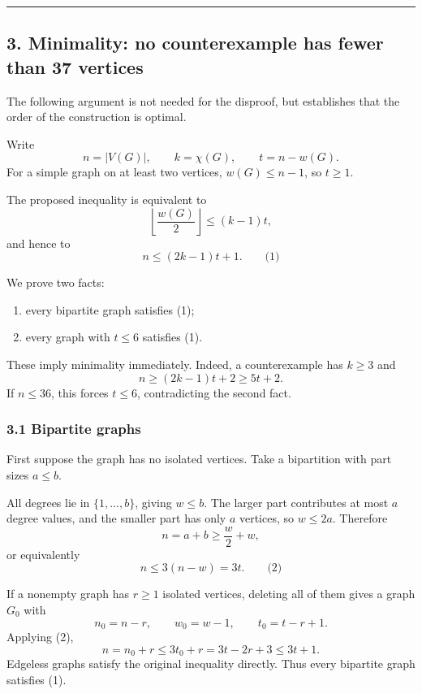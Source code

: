 \documentclass[
  11pt,
  a4paper,
]{article}
\newcounter{none} %
\providecommand{\tightlist}{%
  \setlength{\itemsep}{0pt}\setlength{\parskip}{0pt}}
\begin{document}
\begin{center}\rule{0.5\linewidth}{0.5pt}\end{center}

\subsection{3. Minimality: no counterexample has fewer than 37
vertices}\label{minimality-no-counterexample-has-fewer-than-37-vertices}

The following argument is not needed for the disproof, but establishes
that the order of the construction is optimal.

Write \[
n=|V(G)|,\qquad k=\chi(G),\qquad t=n-w(G).
\] For a simple graph on at least two vertices, \(w(G)\le n-1\), so
\(t\ge1\).

The proposed inequality is equivalent to \[
\left\lfloor\frac{w(G)}2\right\rfloor\le(k-1)t,
\] and hence to \[
\boxed{n\le(2k-1)t+1.} \qquad\text{(1)}
\]

We prove two facts:

\begin{enumerate}
\def\labelenumi{\arabic{enumi}.}
\tightlist
\item
  every bipartite graph satisfies (1);
\item
  every graph with \(t\le6\) satisfies (1).
\end{enumerate}

These imply minimality immediately. Indeed, a counterexample has
\(k\ge3\) and \[
n\ge(2k-1)t+2\ge5t+2.
\] If \(n\le36\), this forces \(t\le6\), contradicting the second fact.

\subsubsection{3.1 Bipartite graphs}\label{bipartite-graphs}

First suppose the graph has no isolated vertices. Take a bipartition
with part sizes \(a\le b\).

All degrees lie in \(\{1,\ldots,b\}\), giving \(w\le b\). The larger
part contributes at most \(a\) degree values, and the smaller part has
only \(a\) vertices, so \(w\le2a\). Therefore \[
n=a+b\ge \frac w2+w,
\] or equivalently \[
n\le3(n-w)=3t. \qquad\text{(2)}
\]

If a nonempty graph has \(r\ge1\) isolated vertices, deleting all of
them gives a graph \(G_0\) with \[
n_0=n-r,\qquad w_0=w-1,\qquad t_0=t-r+1.
\] Applying (2), \[
n=n_0+r\le3t_0+r=3t-2r+3\le3t+1.
\] Edgeless graphs satisfy the original inequality directly. Thus every
bipartite graph satisfies (1).
\end{document}
